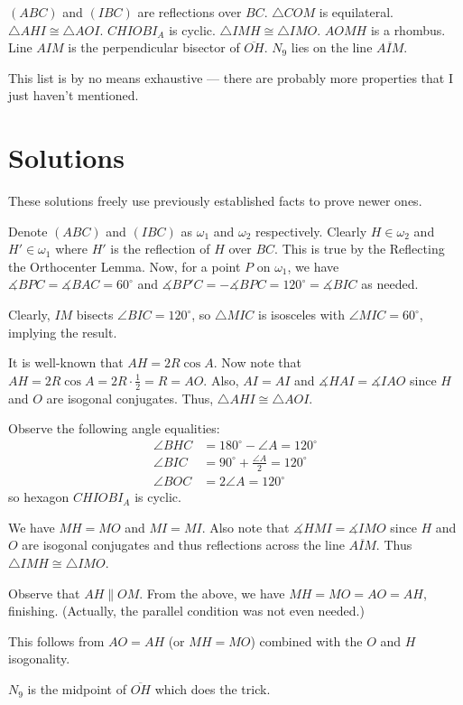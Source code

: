 \documentclass[11pt]{scrartcl}
\begin{document}
\begin{enumerate}
	\ii $(ABC)$ and $(IBC)$ are reflections over $BC$.
	\ii $\triangle COM$ is equilateral.
	\ii $\triangle AHI\cong \triangle AOI$.
	\ii $CHIOBI_A$ is cyclic.
	\ii $\triangle IMH\cong \triangle IMO$.
	\ii $AOMH$ is a rhombus.
	\ii Line $AIM$ is the perpendicular bisector of $\overline{OH}$. 
	\ii $N_9$ lies on the line $\overline{AIM}$.
\end{enumerate}
This list is by no means exhaustive --- there are probably more properties that I just haven't mentioned.
\vspace{2em}
\section{Solutions}


These solutions freely use previously established facts to prove newer ones.
\begin{enumerate}
	\ii Denote $(ABC)$ and $(IBC)$ as $\omega_1$ and $\omega_2$ respectively. Clearly $H\in \omega_2$ and $H'\in\omega_1$ where $H'$ is the reflection of $H$ over $BC$. This is true by the Reflecting the Orthocenter Lemma. Now, for a point $P$ on $\omega_1$, we have $\measuredangle BPC=\measuredangle BAC=60^\circ$ and $\measuredangle BP'C=-\measuredangle BPC=120^\circ=\measuredangle BIC$ as needed.
    
	\ii Clearly, $IM$ bisects $\angle BIC=120^\circ$, so $\triangle MIC$ is isosceles with $\angle MIC=60^\circ$, implying the result.
    
	\ii It is well-known that $AH=2R\cos A$. Now note that $AH=2R\cos A=2R\cdot \frac12=R=AO$. Also, $AI=AI$ and $\measuredangle HAI=\measuredangle IAO$ since $H$ and $O$ are isogonal conjugates. Thus, $\triangle AHI\cong \triangle AOI$.
    
	\ii Observe the following angle equalities:\begin{align*} \angle BHC&=180^\circ-\angle A=120^\circ\\ \angle BIC&=90^\circ+\frac{\angle A}2=120^\circ\\ \angle BOC&=2\angle A=120^\circ \end{align*}
so hexagon $CHIOBI_A$ is cyclic.

	\ii We have $MH=MO$ and $MI=MI$. Also note that $\measuredangle HMI=\measuredangle IMO$ since $H$ and $O$ are isogonal conjugates and thus reflections across the line $\overline{AIM}$. Thus $\triangle IMH\cong \triangle IMO$.
    
	\ii Observe that $AH\parallel OM$. From the above, we have $MH=MO=AO=AH$, finishing. (Actually, the parallel condition was not even needed.)
    
	\ii This follows from $AO=AH$ (or $MH=MO$) combined with the $O$ and $H$ isogonality.
    
	\ii $N_9$ is the midpoint of $\overline{OH}$ which does the trick.
\end{enumerate}
\vspace{18em}
\end{document}
